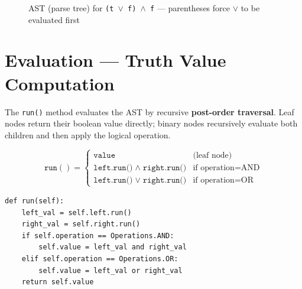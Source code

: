 \begin{figure}[H]
\centering
{}
\caption{AST (parse tree) for \texttt{(t $\vee$ f) $\wedge$ f} --- parentheses force $\vee$ to be evaluated first}
\label{fig:ast_paren}
\end{figure}


\section{Evaluation --- Truth Value Computation}

The \texttt{run()} method evaluates the AST by recursive \textbf{post-order traversal}.  Leaf nodes return their boolean value directly; binary nodes recursively evaluate both children and then apply the logical operation.

\begin{equation}
\texttt{run}() = \begin{cases}
\texttt{value} & \text{(leaf node)} \\[4pt]
\texttt{left.run()} \;\wedge\; \texttt{right.run()} & \text{if operation} = \text{AND} \\[4pt]
\texttt{left.run()} \;\vee\; \texttt{right.run()} & \text{if operation} = \text{OR}
\end{cases}
\end{equation}

\begin{lstlisting}[caption={Evaluation method in \texttt{Expression\_logic}}, label={lst:run}]
def run(self):
    left_val = self.left.run()
    right_val = self.right.run()
    if self.operation == Operations.AND:
        self.value = left_val and right_val
    elif self.operation == Operations.OR:
        self.value = left_val or right_val
    return self.value
\end{lstlisting}


